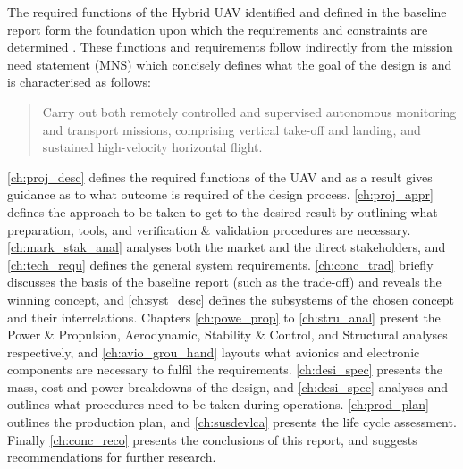 The required functions of the Hybrid UAV identified and defined in the baseline report form the foundation upon which the requirements and constraints are determined \cite{baseline}. These functions and requirements follow indirectly from the mission need statement (MNS) which concisely defines what the goal of the design is and is characterised as follows:

\begin{quote}
\begin{itshape}
Carry out both remotely controlled and supervised autonomous monitoring and transport missions, comprising vertical take-off and landing, and sustained high-velocity horizontal flight.
\end{itshape}
\end{quote}

\autoref{ch:proj_desc} defines the required functions of the UAV and as a result gives guidance as to what outcome is required of the design process. \autoref{ch:proj_appr} defines the approach to be taken to get to the desired result by outlining what preparation, tools, and verification \& validation procedures are necessary. \autoref{ch:mark_stak_anal} analyses both the market and the direct stakeholders, and \autoref{ch:tech_requ} defines the general system requirements. \autoref{ch:conc_trad} briefly discusses the basis of the baseline report (such as the trade-off) and reveals the winning concept, and \autoref{ch:syst_desc} defines the subsystems of the chosen concept and their interrelations. Chapters \ref{ch:powe_prop} to \ref{ch:stru_anal} present the Power \& Propulsion, Aerodynamic, Stability \& Control, and Structural analyses respectively, and \autoref{ch:avio_grou_hand} layouts what avionics and electronic components are necessary to fulfil the requirements. \autoref{ch:desi_spec} presents the mass, cost and power breakdowns of the design, and \autoref{ch:desi_spec} analyses and outlines what procedures need to be taken during operations. \autoref{ch:prod_plan} outlines the production plan, and \autoref{ch:susdevlca} presents the life cycle assessment. Finally \autoref{ch:conc_reco} presents the conclusions of this report, and suggests recommendations for further research.


